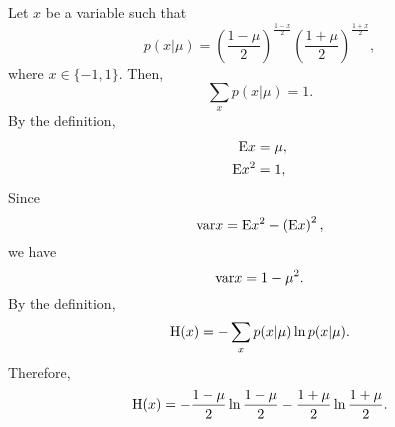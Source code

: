 \subsection{}
\label{2.2}
Let $x$ be a variable such that
%
\begin{equation}
p(x | \mu) = \left( \frac{1 - \mu}{2} \right) ^ \frac{1 - x}{2} \left( \frac{1 + \mu}{2} \right) ^ \frac{1 + x}{2},
\end{equation}
%
where $x \in \{ -1, 1 \}$.
Then,
%
\begin{equation}
\sum_{x} p(x | \mu) = 1.
\end{equation}
%
By the definition,
%
\begin{equation}
\begin{aligned}
{\rm E} x &= \mu, \\
{\rm E} x ^ 2 &= 1,
\end{aligned}
\end{equation}
%
Since
%
\begin{equation}
{\rm var} x = {\rm E} x ^ 2 - \left( {\rm E} x \right) ^ 2,
\end{equation}
%
we have
%
\begin{equation}
{\rm var} x = 1 - \mu ^ 2.
\end{equation}
%
By the definition,
%
\begin{equation}
{\rm H} (x) = - \sum_{x} p(x | \mu) \ln p(x | \mu).
\end{equation}
%
Therefore,
%
\begin{equation}
{\rm H} (x) = - \frac{1 - \mu}{2} \ln \frac{1 - \mu}{2} - \frac{1 + \mu}{2} \ln \frac{1 + \mu}{2}.
\end{equation}
%














































